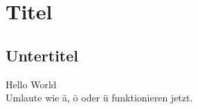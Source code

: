 \documentclass[a4paper, 10pt, fleqn]{article}
\begin{document}
    \section{Titel}
    \subsection{Untertitel}
    Hello World
    \\
    Umlaute wie ä, ö oder ü funktionieren jetzt. 
\end{document}

